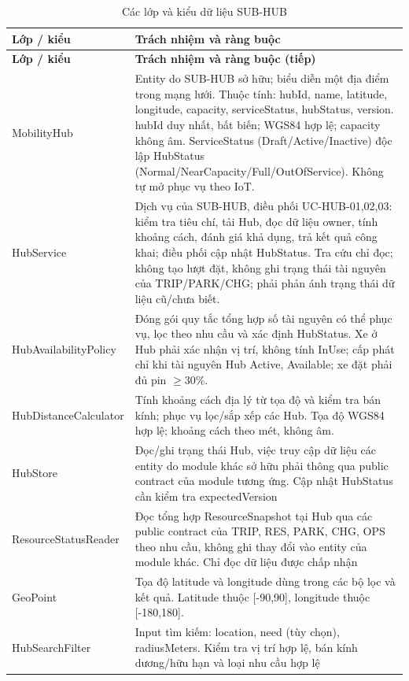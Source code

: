 \begin{longtable}{|L{37mm}|L{102mm}|}
\caption{Các lớp và kiểu dữ liệu SUB-HUB}\\\hline
\textbf{Lớp / kiểu} & \textbf{Trách nhiệm và ràng buộc}\\\hline
\endfirsthead
\hline\textbf{Lớp / kiểu} & \textbf{Trách nhiệm và ràng buộc (tiếp)}\\\hline\endhead
MobilityHub & Entity do SUB-HUB sở hữu; biểu diễn một địa điểm trong mạng lưới. Thuộc tính: hubId, name, latitude, longitude, capacity, serviceStatus, hubStatus, version.  hubId duy nhất, bất biến; WGS84 hợp lệ; capacity không âm. ServiceStatus (Draft/Active/Inactive) độc lập HubStatus (Normal/NearCapacity/Full/OutOfService). Không tự mở phục vụ theo IoT.\\\hline
HubService & Dịch vụ của SUB-HUB, điều phối UC-HUB-01,02,03: kiểm tra tiêu chí, tải Hub, đọc dữ liệu owner, tính khoảng cách, đánh giá khả dụng, trả kết quả công khai; điều phối cập nhật HubStatus.  Tra cứu chỉ đọc; không tạo lượt đặt, không ghi trạng thái tài nguyên của TRIP/PARK/CHG; phải phản ánh trạng thái dữ liệu cũ/chưa biết.\\\hline
Hub\allowbreak Availability\allowbreak Policy & Đóng gói quy tắc tổng hợp số tài nguyên có thể phục vụ, lọc theo nhu cầu và xác định HubStatus.  Xe ở Hub phải xác nhận vị trí, không tính InUse; cấp phát chỉ khi tài nguyên Hub Active, Available; xe đặt phải đủ pin $\geq$30\%.\\\hline
Hub\allowbreak Distance\allowbreak Calculator & Tính khoảng cách địa lý từ tọa độ và kiểm tra bán kính; phục vụ lọc/sắp xếp các Hub.  Tọa độ WGS84 hợp lệ; khoảng cách theo mét, không âm.\\\hline
HubStore & Đọc/ghi trạng thái Hub, việc truy cập dữ liệu các entity do module khác sở hữu phải thông qua public contract của module tương ứng.  Cập nhật HubStatus cần kiểm tra expectedVersion\\\hline
Resource\allowbreak Status\allowbreak Reader & Đọc tổng hợp ResourceSnapshot tại Hub qua các public contract của TRIP, RES, PARK, CHG, OPS theo nhu cầu, không ghi thay đổi vào entity của module khác.  Chỉ đọc dữ liệu được chấp nhận\\\hline
GeoPoint & Tọa độ latitude và longitude dùng trong các bộ lọc và kết quả.  Latitude thuộc [-90,90], longitude thuộc [-180,180].\\\hline
HubSearchFilter & Input tìm kiếm: location, need (tùy chọn), radiusMeters.  Kiểm tra vị trí hợp lệ, bán kính dương/hữu hạn và loại nhu cầu hợp lệ\\\hline

\end{longtable}
